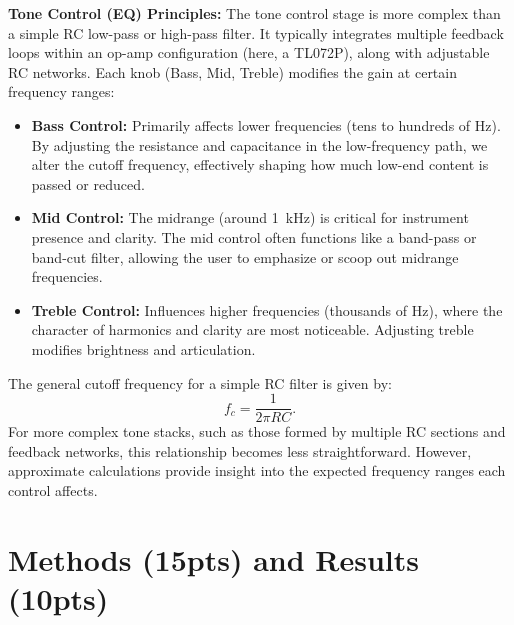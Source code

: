 \documentclass[12pt,a4paper]{article}
\begin{document}
\textbf{Tone Control (EQ) Principles:}  
The tone control stage is more complex than a simple RC low-pass or high-pass filter. It typically integrates multiple feedback loops within an op-amp configuration (here, a TL072P), along with adjustable RC networks. Each knob (Bass, Mid, Treble) modifies the gain at certain frequency ranges:
\begin{itemize}
    \item \textbf{Bass Control:} Primarily affects lower frequencies (tens to hundreds of Hz). By adjusting the resistance and capacitance in the low-frequency path, we alter the cutoff frequency, effectively shaping how much low-end content is passed or reduced.
    \item \textbf{Mid Control:} The midrange (around \SI{1}{kHz}) is critical for instrument presence and clarity. The mid control often functions like a band-pass or band-cut filter, allowing the user to emphasize or scoop out midrange frequencies.
    \item \textbf{Treble Control:} Influences higher frequencies (thousands of Hz), where the character of harmonics and clarity are most noticeable. Adjusting treble modifies brightness and articulation.
\end{itemize}

The general cutoff frequency for a simple RC filter is given by:
\[
f_c = \frac{1}{2\pi RC}.
\]
For more complex tone stacks, such as those formed by multiple RC sections and feedback networks, this relationship becomes less straightforward. However, approximate calculations provide insight into the expected frequency ranges each control affects.

\section{Methods (15pts) and Results (10pts)}
\end{document}
